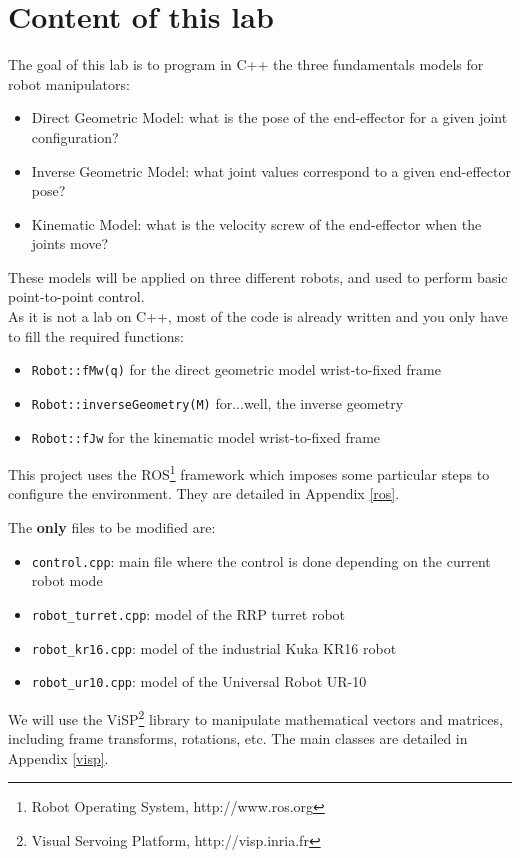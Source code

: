 \documentclass{ecnreport}
\begin{document}

\section{Content of this lab}

The goal of this lab is to program in C++ the three fundamentals models for robot manipulators:
\begin{itemize}
	\item Direct Geometric Model: what is the pose of the end-effector for a given joint configuration?
	\item Inverse Geometric Model: what joint values correspond to a given end-effector pose?
	\item Kinematic Model: what is the velocity screw of the end-effector when the joints move?
\end{itemize}
These models will be applied on three different robots, and used to perform basic point-to-point control.\\

As it is not a lab on C++, most of the code is already written and you only have to fill the required functions:
\begin{itemize}
	\item \texttt{Robot::fMw(q)} for the direct geometric model wrist-to-fixed frame
	\item \texttt{Robot::inverseGeometry(M)} for...well, the inverse geometry
	\item \texttt{Robot::fJw} for the kinematic model wrist-to-fixed frame
\end{itemize}

This project uses the ROS\footnote{Robot Operating System, http://www.ros.org} framework which imposes some particular steps to configure the environment. They are detailed in Appendix \ref{ros}.

The {\bf only} files to be modified are:
\begin{itemize}
	\item \texttt{control.cpp}: main file where the control is done depending on the current robot mode
	\item \texttt{robot\_turret.cpp}: model of the RRP turret robot
	\item \texttt{robot\_kr16.cpp}: model of the industrial Kuka KR16 robot
	\item \texttt{robot\_ur10.cpp}: model of the Universal Robot UR-10
\end{itemize}
We will use the ViSP\footnote{Visual Servoing Platform, http://visp.inria.fr} library to manipulate mathematical vectors and matrices, including frame transforms, rotations, etc. The main classes are detailed in Appendix \ref{visp}.\\
\end{document}
